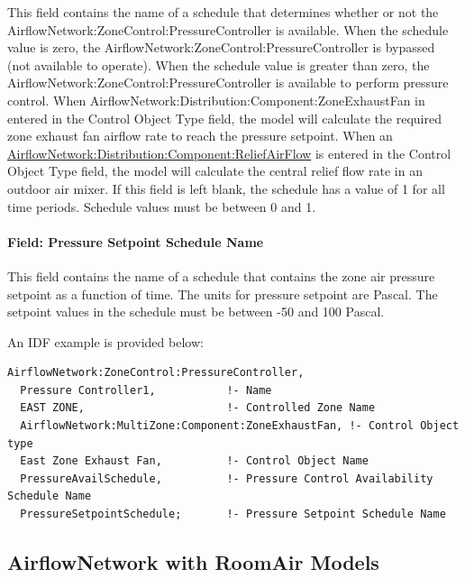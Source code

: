This field contains the name of a schedule that determines whether or not the AirflowNetwork:ZoneControl:PressureController is available. When the schedule value is zero, the AirflowNetwork:ZoneControl:PressureController is bypassed (not available to operate). When the schedule value is greater than zero, the AirflowNetwork:ZoneControl:PressureController is available to perform pressure control. When AirflowNetwork:Distribution:Component:ZoneExhaustFan in entered in the Control Object Type field, the model will calculate the required zone exhaust fan airflow rate to reach the pressure setpoint. When an \hyperref[airflowNetworkdistributioncomponentreliefairflow]{AirflowNetwork:Distribution:Component:ReliefAirFlow} is entered in the Control Object Type field, the model will calculate the central relief flow rate in an outdoor air mixer. If this field is left blank, the schedule has a value of 1 for all time periods. Schedule values must be between 0 and 1.

\paragraph{ Field: Pressure Setpoint Schedule Name}\label{field-pressure-setpoint-schedule-name}

This field contains the name of a schedule that contains the zone air pressure setpoint as a function of time. The units for pressure setpoint are Pascal. The setpoint values in the schedule must be between -50 and 100 Pascal.

An IDF example is provided below:

\begin{lstlisting}
AirflowNetwork:ZoneControl:PressureController,
  Pressure Controller1,           !- Name
  EAST ZONE,                      !- Controlled Zone Name
  AirflowNetwork:MultiZone:Component:ZoneExhaustFan, !- Control Object type
  East Zone Exhaust Fan,          !- Control Object Name
  PressureAvailSchedule,          !- Pressure Control Availability Schedule Name
  PressureSetpointSchedule;       !- Pressure Setpoint Schedule Name
\end{lstlisting}

\subsection{AirflowNetwork with RoomAir Models}\label{airflownetwork-roomair-models}

